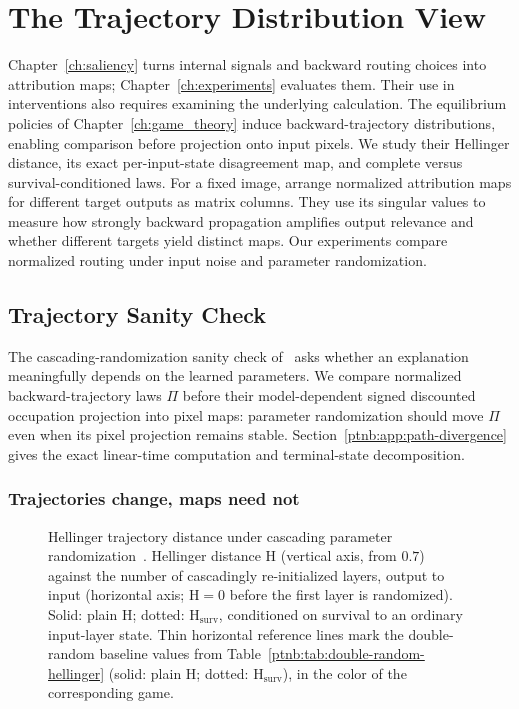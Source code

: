 \chapter{The Trajectory Distribution View}\label{ch:trajectory}

Chapter~\ref{ch:saliency} turns internal signals and backward routing choices into attribution maps; Chapter~\ref{ch:experiments} evaluates them. Their use in interventions also requires examining the underlying calculation. The equilibrium policies of Chapter~\ref{ch:game_theory} induce backward-trajectory distributions, enabling comparison before projection onto input pixels. We study their Hellinger distance, its exact per-input-state disagreement map, and complete versus survival-conditioned laws. For a fixed image, \textcite{Maess2026Spectral} arrange normalized attribution maps for different target outputs as matrix columns. They use its singular values to measure how strongly backward propagation amplifies output relevance and whether different targets yield distinct maps. Our experiments compare normalized routing under input noise and parameter randomization.

\section{Trajectory Sanity Check}\label{ptnb:sec:hellinger-sanity}\label{ptnb:sec:hellinger}

The cascading-randomization sanity check of~\textcite{Adebayo2018sanity} asks whether an explanation meaningfully depends on the learned parameters. We compare normalized backward-trajectory laws $\Pi$ before their model-dependent signed discounted occupation projection into pixel maps: parameter randomization should move $\Pi$ even when its pixel projection remains stable. Section~\ref{ptnb:app:path-divergence} gives the exact linear-time computation and terminal-state decomposition.

\subsection{Trajectories change, maps need not}\label{ptnb:sec:hellinger-cascading}

\begin{figure}[t]
    \centering
    
    \caption[Hellinger trajectory distance under parameter randomization]{Hellinger trajectory distance under cascading parameter
    randomization~\parencite{Adebayo2018sanity}. Hellinger distance $\mathrm{H}$ (vertical axis, from
    $0.7$) against the number of cascadingly re-initialized layers, output to input (horizontal axis;
    $\mathrm{H}=0$ before the first layer is randomized). Solid: plain $\mathrm{H}$; dotted:
    $\mathrm{H}_{\mathrm{surv}}$, conditioned on survival to an ordinary input-layer state. Thin
    horizontal reference lines mark the double-random baseline values from
    Table~\ref{ptnb:tab:double-random-hellinger} (solid: plain $\mathrm{H}$; dotted:
    $\mathrm{H}_{\mathrm{surv}}$), in the color of the corresponding game.}
    \label{ptnb:fig:hellinger-sanity}
\end{figure}

